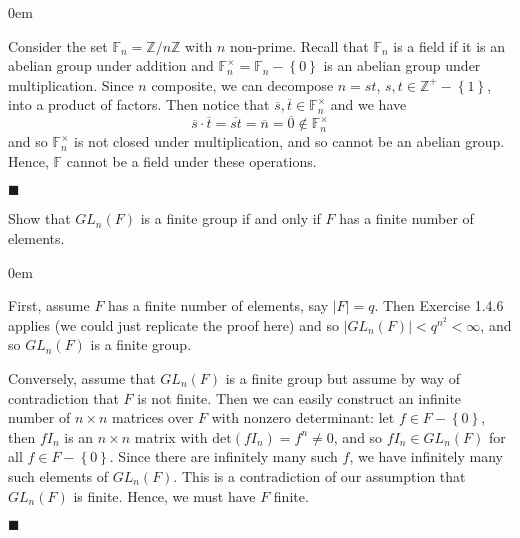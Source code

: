 \documentclass[12pt]{article}
\renewcommand{\qed}{\hfill$\blacksquare$}
\renewenvironment{proof}{\begin{addmargin}[1em]{0em}\begin{newproof}}{\end{newproof}\end{addmargin}\qed}
\newenvironment{problem}[2][Exercise]{\begin{trivlist}
\item[\hskip \labelsep {\bfseries #1}\hskip \labelsep {\bfseries #2.}]}{\end{trivlist}}
\begin{document}
\begin{proof}
Consider the set $\mathbb{F}_n=\mathbb{Z}/n\mathbb{Z}$ with $n$ non-prime. Recall that $\mathbb{F}_n$ is a field if it is an abelian group under addition and $\mathbb{F}_n^{\times}= \mathbb{F}_n-\left\{0\right\}$ is an abelian group under multiplication. Since $n$ composite, we can decompose $n=st$, $s,t\in \mathbb{Z}^+-\left\{1\right\}$, into a product of factors. Then notice that $\overline{s}, \overline{t} \in \mathbb{F}_n^{\times}$ and we have
$$ \overline{s}\cdot \overline{t} = \overline{st} = \overline{n} = \overline{0} \notin \mathbb{F}_n^{\times} $$ and so $\mathbb{F}_n^{\times}$ is not closed under multiplication, and so cannot be an abelian group. Hence, $\mathbb{F}$ cannot be a field under these operations.
\end{proof}



\begin{problem}{1.4.5}
Show that $GL_n\left(F\right)$ is a finite group if and only if $F$ has a finite number of elements.
\end{problem}
\begin{proof}
First, assume $F$ has a finite number of elements, say $\left|F\right|=q$. Then Exercise 1.4.6 applies (we could just replicate the proof here) and so $\left|GL_n\left(F\right)\right|<q^{n^2} < \infty$, and so $GL_n\left(F\right)$ is a finite group.

Conversely, assume that $GL_n\left(F\right)$ is a finite group but assume by way of contradiction that $F$ is not finite. Then we can easily construct an infinite number of $n\times n$ matrices over $F$ with nonzero determinant: let $f\in F-\left\{0\right\}$, then $fI_{n}$ is an $n\times n$ matrix with $\text{det}\left(fI_{n}\right) = f^n \neq 0$, and so $fI_{n} \in GL_n\left(F\right)$ for all $f\in F-\left\{0\right\}$. Since there are infinitely many such $f$, we have infinitely many such elements of $GL_n\left(F\right)$. This is a contradiction of our assumption that $GL_n\left(F\right)$ is finite. Hence, we must have $F$ finite.
\end{proof}
\end{document}

